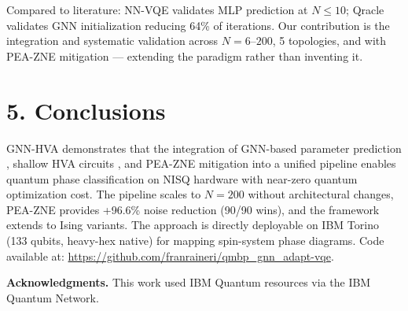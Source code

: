 \documentclass[11pt,a4paper,spanish]{book}
\begin{document}
Compared to literature: NN-VQE \citep{miao2024} validates MLP prediction at $N \leq 10$; Qracle \citep{zhang2025} validates GNN initialization reducing 64\% of iterations. Our contribution is the integration and systematic validation across $N = 6$--$200$, 5 topologies, and with PEA-ZNE mitigation --- extending the paradigm rather than inventing it.

\section*{5. Conclusions}

GNN-HVA demonstrates that the integration of GNN-based parameter prediction \citep{miao2024, zhang2025}, shallow HVA circuits \citep{wiersema2020, mele2026}, and PEA-ZNE mitigation \citep{kim2023} into a unified pipeline enables quantum phase classification on NISQ hardware with near-zero quantum optimization cost. The pipeline scales to $N = 200$ without architectural changes, PEA-ZNE provides +96.6\% noise reduction (90/90 wins), and the framework extends to Ising variants. The approach is directly deployable on IBM Torino (133 qubits, heavy-hex native) for mapping spin-system phase diagrams. Code available at: \url{https://github.com/franraineri/qmbp_gnn_adapt-vqe}.

\vspace{0.3cm}
\noindent\textbf{Acknowledgments.} This work used IBM Quantum resources via the IBM Quantum Network.
\end{document}

